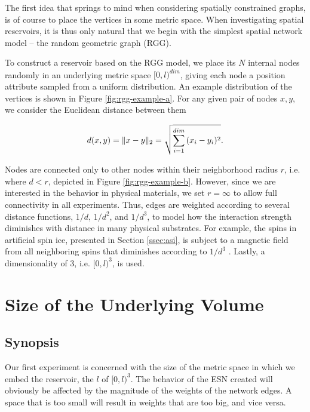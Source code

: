 The first idea that springs to mind when considering spatially constrained
graphs, is of course to place the vertices in some metric space. When
investigating spatial reservoirs, it is thus only natural that we begin with the
simplest spatial network model -- the random geometric graph (RGG).

To construct a reservoir based on the RGG model, we place its $N$ internal nodes
randomly in an underlying metric space $[0, l)^{dim}$, giving each node a
position attribute sampled from a uniform distribution. An example distribution
of the vertices is shown in Figure \ref{fig:rgg-example-a}. For any given pair
of nodes $x, y$, we consider the Euclidean distance between them

\begin{equation}
  d(x, y) = \Vert x-y \Vert_{2} = \sqrt{\sum_{i=1}^{dim}{(x_{i}-y_{i})^2}}.
  \label{eq:rgg-dist}
\end{equation}

Nodes are connected only to other nodes within their neighborhood radius $r$,
i.e. where $d < r$, depicted in Figure \ref{fig:rgg-example-b}. However, since
we are interested in the behavior in physical materials, we set $r = \infty$ to
allow full connectivity in all experiments. Thus, edges are weighted according
to several distance functions, $1/d$, $1/d^2$, and $1/d^3$, to model how the
interaction strength diminishes with distance in many physical substrates. For
example, the spins in artificial spin ice, presented in Section \ref{ssec:asi},
is subject to a magnetic field from all neighboring spins that diminishes
according to $1/d^3$ \cite{jensen_computation_2018}. Lastly, a dimensionality of
3, i.e. $[0, l)^{3}$, is used.

\section{Size of the Underlying Volume}
\label{sec:volume-size}

\subsection{Synopsis}

Our first experiment is concerned with the size of the metric space in which we
embed the reservoir, the $l$ of $[0, l)^3$. The behavior of the ESN created will
obviously be affected by the magnitude of the weights of the network edges. A
space that is too small will result in weights that are too big, and vice versa.

